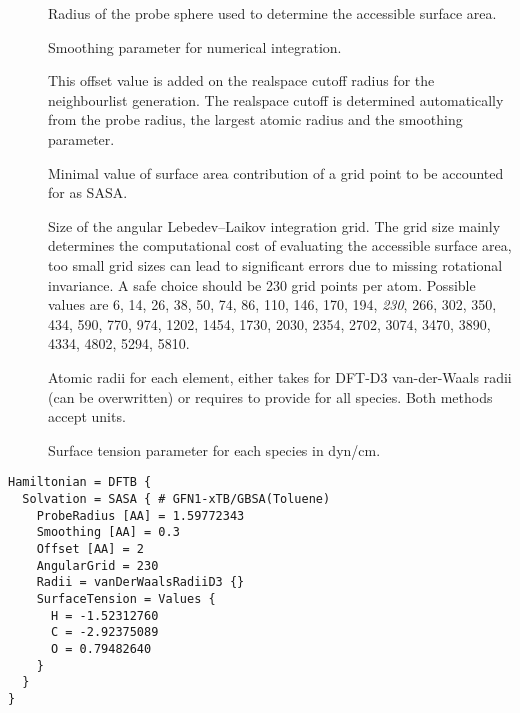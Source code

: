 \begin{description}
  \item[] 
    Radius of the probe sphere used to determine the accessible surface area.

  \item[] 
    Smoothing parameter for numerical integration.

  \item[] 
    This offset value is added on the realspace cutoff radius for the
    neighbourlist generation.
    The realspace cutoff is determined automatically from the probe radius,
    the largest atomic radius and the smoothing parameter.

  \item[]
    Minimal value of surface area contribution of a grid point to be accounted
    for as SASA.

  \item[]
    Size of the angular Lebedev--Laikov integration grid.\cite{lebedev1999}
    The grid size mainly determines the computational cost of evaluating the
    accessible surface area, too small grid sizes can lead to significant errors
    due to missing rotational invariance.
    A safe choice should be 230 grid points per atom.
    Possible values are
    6, 14, 26, 38, 50, 74, 86, 110, 146, 170, 194, \textit{230}, 266, 302, 350,
    434, 590, 770, 974, 1202, 1454, 1730, 2030, 2354, 2702, 3074, 3470, 3890,
    4334, 4802, 5294, 5810.

  \item[] Atomic radii for each element, either takes
     for DFT-D3 van-der-Waals radii (can be overwritten)
    or requires to provide  for all species.
    Both methods accept  units.

  \item[]
    Surface tension parameter for each species in dyn/cm.

\end{description}

\begin{verbatim}
Hamiltonian = DFTB {
  Solvation = SASA { # GFN1-xTB/GBSA(Toluene)
    ProbeRadius [AA] = 1.59772343
    Smoothing [AA] = 0.3
    Offset [AA] = 2
    AngularGrid = 230
    Radii = vanDerWaalsRadiiD3 {}
    SurfaceTension = Values {
      H = -1.52312760
      C = -2.92375089
      O = 0.79482640
    }
  }
}
\end{verbatim}


